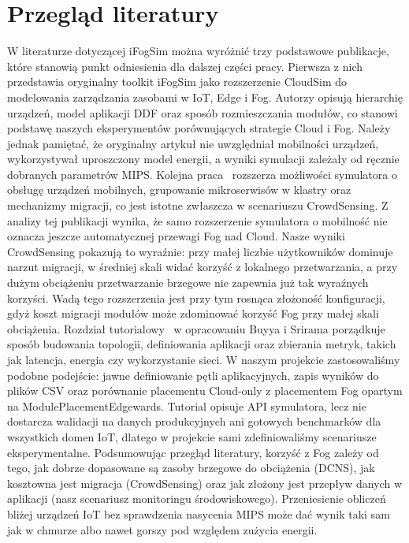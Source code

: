 \documentclass[
    oneside,            %
    left=2.5cm,         %
    right=2.5cm,        %
    top=2.5cm,          %
    bottom=3cm,         %
    bindingoffset=6mm,  %
    nohyphenation=false %
]{eiti/eiti-report}
\begin{document}
\section{Przegląd literatury}
W literaturze dotyczącej iFogSim można wyróżnić trzy podstawowe publikacje, które stanowią punkt odniesienia dla dalszej części pracy.
Pierwsza z nich~\cite{iFogSimSPE} przedstawia oryginalny toolkit iFogSim jako rozszerzenie CloudSim do modelowania zarządzania zasobami w IoT, Edge i Fog. Autorzy opisują hierarchię urządzeń, model aplikacji DDF oraz sposób rozmieszczania modułów, co stanowi podstawę naszych eksperymentów porównujących strategie Cloud i Fog. Należy jednak pamiętać, że oryginalny artykuł nie uwzględniał mobilności urządzeń, wykorzystywał uproszczony model energii, a wyniki symulacji zależały od ręcznie dobranych parametrów MIPS.
Kolejna praca~\cite{iFogSim2JSS} rozszerza możliwości symulatora o obsługę urządzeń mobilnych, grupowanie mikroserwisów w klastry oraz mechanizmy migracji, co jest istotne zwłaszcza w scenariuszu CrowdSensing. Z analizy tej publikacji wynika, że samo rozszerzenie symulatora o mobilność nie oznacza jeszcze automatycznej przewagi Fog nad Cloud. Nasze wyniki CrowdSensing pokazują to wyraźnie: przy małej liczbie użytkowników dominuje narzut migracji, w średniej skali widać korzyść z lokalnego przetwarzania, a przy dużym obciążeniu przetwarzanie brzegowe nie zapewnia już tak wyraźnych korzyści. Wadą tego rozszerzenia jest przy tym rosnąca złożoność konfiguracji, gdyż koszt migracji modułów może zdominować korzyść Fog przy małej skali obciążenia.
Rozdział tutorialowy~\cite{iFogSimTutBook} w opracowaniu Buyya i Srirama porządkuje sposób budowania topologii, definiowania aplikacji oraz zbierania metryk, takich jak latencja, energia czy wykorzystanie sieci. W naszym projekcie zastosowaliśmy podobne podejście: jawne definiowanie pętli aplikacyjnych, zapis wyników do plików CSV oraz porównanie placementu Cloud-only z placementem Fog opartym na ModulePlacementEdgewards. Tutorial opisuje API symulatora, lecz nie dostarcza walidacji na danych produkcyjnych ani gotowych benchmarków dla wszystkich domen IoT, dlatego w projekcie sami zdefiniowaliśmy scenariusze eksperymentalne.
Podsumowując przegląd literatury, korzyść z Fog zależy od tego, jak dobrze dopasowane są zasoby brzegowe do obciążenia (DCNS), jak kosztowna jest migracja (CrowdSensing) oraz jak złożony jest przepływ danych w aplikacji (nasz scenariusz monitoringu środowiskowego). Przeniesienie obliczeń bliżej urządzeń IoT bez sprawdzenia nasycenia MIPS może dać wynik taki sam jak w chmurze albo nawet gorszy pod względem zużycia energii.
\end{document}
